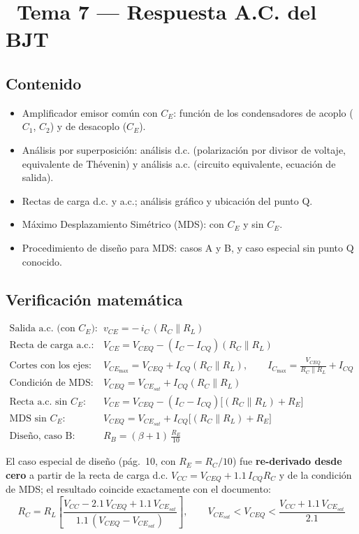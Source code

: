 \documentclass[11pt,a4paper]{article}
\newcommand{\iconotexto}[2]{\textcolor{cyanNeon}{\faIcon{#1}}~#2}
\begin{document}
\section{\iconotexto{wave-square}{Tema 7 --- Respuesta A.C. del BJT}}

\subsection{Contenido}
\begin{itemize}[leftmargin=1.4em]
  \item Amplificador emisor común con $C_E$: función de los condensadores de acoplo ($C_1$, $C_2$) y de desacoplo ($C_E$).
  \item Análisis por superposición: análisis d.c. (polarización por divisor de voltaje, equivalente de Thévenin) y análisis a.c. (circuito equivalente, ecuación de salida).
  \item Rectas de carga d.c. y a.c.; análisis gráfico y ubicación del punto Q.
  \item Máximo Desplazamiento Simétrico (MDS): con $C_E$ y sin $C_E$.
  \item Procedimiento de diseño para MDS: casos A y B, y caso especial sin punto Q conocido.
\end{itemize}

\subsection{Verificación matemática}

\begin{tcolorbox}[cajaFortaleza, title={\faIcon{check-circle}~Derivaciones verificadas --- todas correctas}]
\begin{align*}
\text{Salida a.c. (con } C_E\text{):}\quad
  & v_{CE} = -\,i_C\,(R_C \parallel R_L) \\
\text{Recta de carga a.c.:}\quad
  & V_{CE} = V_{CEQ} - (I_C - I_{CQ})(R_C \parallel R_L) \\
\text{Cortes con los ejes:}\quad
  & V_{CE_{\max}} = V_{CEQ} + I_{CQ}(R_C \parallel R_L), \qquad
  I_{C_{\max}} = \frac{V_{CEQ}}{R_C \parallel R_L} + I_{CQ} \\
\text{Condición de MDS:}\quad
  & V_{CEQ} = V_{CE_{sat}} + I_{CQ}(R_C \parallel R_L) \\
\text{Recta a.c. sin } C_E\text{:}\quad
  & V_{CE} = V_{CEQ} - (I_C - I_{CQ})\bigl[(R_C \parallel R_L) + R_E\bigr] \\
\text{MDS sin } C_E\text{:}\quad
  & V_{CEQ} = V_{CE_{sat}} + I_{CQ}\bigl[(R_C \parallel R_L) + R_E\bigr] \\
\text{Diseño, caso B:}\quad
  & R_B = (\beta + 1)\,\frac{R_E}{10}
\end{align*}

El caso especial de diseño (pág.~10, con $R_E = R_C/10$) fue \textbf{re-derivado desde cero} a partir de la recta de carga d.c. $V_{CC} = V_{CEQ} + 1.1\,I_{CQ}R_C$ y de la condición de MDS; el resultado coincide exactamente con el documento:
\[
R_C = R_L\left[\frac{V_{CC} - 2.1\,V_{CEQ} + 1.1\,V_{CE_{sat}}}{1.1\,(V_{CEQ} - V_{CE_{sat}})}\right],
\qquad
V_{CE_{sat}} < V_{CEQ} < \frac{V_{CC} + 1.1\,V_{CE_{sat}}}{2.1}
\]
\end{tcolorbox}
\end{document}
